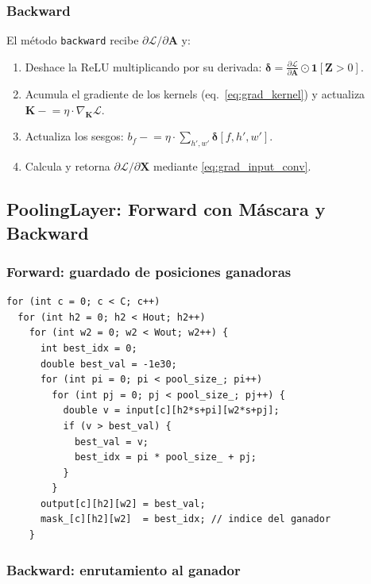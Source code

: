 \documentclass[12pt,a4paper]{article}
\begin{document}
\subsubsection{Backward}

El método \texttt{backward} recibe $\partial\mathcal{L}/\partial\mathbf{A}$ y:

\begin{enumerate}[noitemsep]
  \item Deshace la ReLU multiplicando por su derivada: $\boldsymbol{\delta} =
    \frac{\partial\mathcal{L}}{\partial\mathbf{A}} \odot \mathbf{1}[\mathbf{Z}>0]$.
  \item Acumula el gradiente de los kernels (eq.~\eqref{eq:grad_kernel}) y actualiza
    $\mathbf{K} \mathrel{-}= \eta \cdot \nabla_\mathbf{K}\mathcal{L}$.
  \item Actualiza los sesgos: $b_f \mathrel{-}= \eta \cdot
    \sum_{h',w'} \boldsymbol{\delta}[f, h', w']$.
  \item Calcula y retorna $\partial\mathcal{L}/\partial\mathbf{X}$ mediante
    \eqref{eq:grad_input_conv}.
\end{enumerate}

\subsection{PoolingLayer: Forward con Máscara y Backward}

\subsubsection{Forward: guardado de posiciones ganadoras}

\begin{lstlisting}[caption={MAX Pooling forward con máscara de posiciones ganadoras}]
for (int c = 0; c < C; c++)
  for (int h2 = 0; h2 < Hout; h2++)
    for (int w2 = 0; w2 < Wout; w2++) {
      int best_idx = 0;
      double best_val = -1e30;
      for (int pi = 0; pi < pool_size_; pi++)
        for (int pj = 0; pj < pool_size_; pj++) {
          double v = input[c][h2*s+pi][w2*s+pj];
          if (v > best_val) {
            best_val = v;
            best_idx = pi * pool_size_ + pj;
          }
        }
      output[c][h2][w2] = best_val;
      mask_[c][h2][w2]  = best_idx; // indice del ganador
    }
\end{lstlisting}

\subsubsection{Backward: enrutamiento al ganador}
\end{document}
